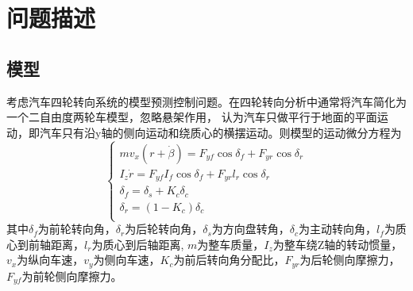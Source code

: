\documentclass[UTF8]{article}
\begin{document}
\pagestyle{fancy}
\fancyhead{}
\fancyhf{}
\renewcommand{\headrulewidth}{0.2pt}
\renewcommand{\footrulewidth}{0.2pt}
\section{问题描述}
\subsection{模型}
考虑汽车四轮转向系统的模型预测控制问题。在四轮转向分析中通常将汽车简化为一个二自由度两轮车模型，忽略悬架作用，
认为汽车只做平行于地面的平面运动，即汽车只有沿y轴的侧向运动和绕质心的横摆运动。则模型的运动微分方程为
\begin{equation}
    \left\{
        \begin{array}{c}
            mv_{x}(r+\dot{ \beta })=F_{yf}\cos \delta_{f}+ F_{yr} \cos \delta_{r} \\
            I_{z}\dot{r}=F_{yf}I_{f}\cos \delta_{f} + F_{yr}l_{r}\cos \delta_{r}\\ 
            \delta_{f} = \delta_{s}+K_{c}\delta_{c}\\
            \delta_{r} = (1-K_{c})\delta_{c}\\
        \end{array}
    \right.
\end{equation}
其中$\delta_{f}$为前轮转向角，$\delta_{r}$为后轮转向角，$\delta_{s}$为方向盘转角，$\delta_{c}$为主动转向角，$l_{f}$为质心到前轴距离，$l_{r}$为质心到后轴距离,
$m$为整车质量，$I_{z}$为整车绕Z轴的转动惯量，$v_{x}$为纵向车速，$v_{y}$为侧向车速，$K_{c}$为前后转向角分配比，$F_{yr}$为后轮侧向摩擦力，$F_{yf}$为前轮侧向摩擦力。
\end{document}
